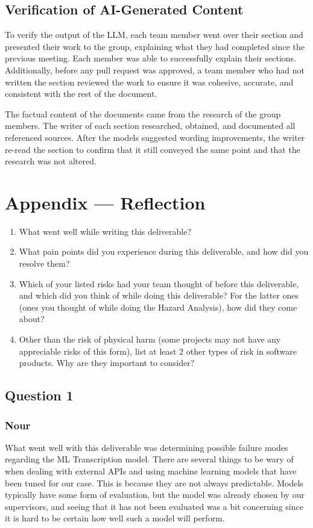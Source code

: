 \documentclass{article}
\begin{document}
\subsection{Verification of AI-Generated Content}

To verify the output of the LLM, each team member went over their section and presented their work to the group, explaining what they had completed since the previous meeting. 
Each member was able to successfully explain their sections. 
Additionally, before any pull request was approved, a team member who had not written the section reviewed the work to ensure it was cohesive, accurate, and consistent with the rest of the document.

The factual content of the documents came from the research of the group members. 
The writer of each section researched, obtained, and documented all referenced sources. 
After the models suggested wording improvements, the writer re-read the section to confirm that it still conveyed the same point and that the research was not altered.


\newpage{}

\section{Appendix --- Reflection}



\begin{enumerate}
\item What went well while writing this deliverable? 
    \item What pain points did you experience during this deliverable, and how
    did you resolve them?
    \item Which of your listed risks had your team thought of before this
    deliverable, and which did you think of while doing this deliverable? For
    the latter ones (ones you thought of while doing the Hazard Analysis), how
    did they come about?
    \item Other than the risk of physical harm (some projects may not have any
    appreciable risks of this form), list at least 2 other types of risk in
    software products. Why are they important to consider?
\end{enumerate}

\subsection*{Question 1}
\subsubsection*{Nour}
What went well with this deliverable was determining possible failure modes regarding the ML Transcription model. 
There are several things to be wary of when dealing with external APIs and using machine learning models that have been tuned for our case. 
This is because they are not always predictable. Models typically have some form of evaluation, but the model was already chosen by our supervisors, and seeing that it has not been evaluated was a bit concerning since it is hard to be certain how well such a model will perform. 
\end{document}
